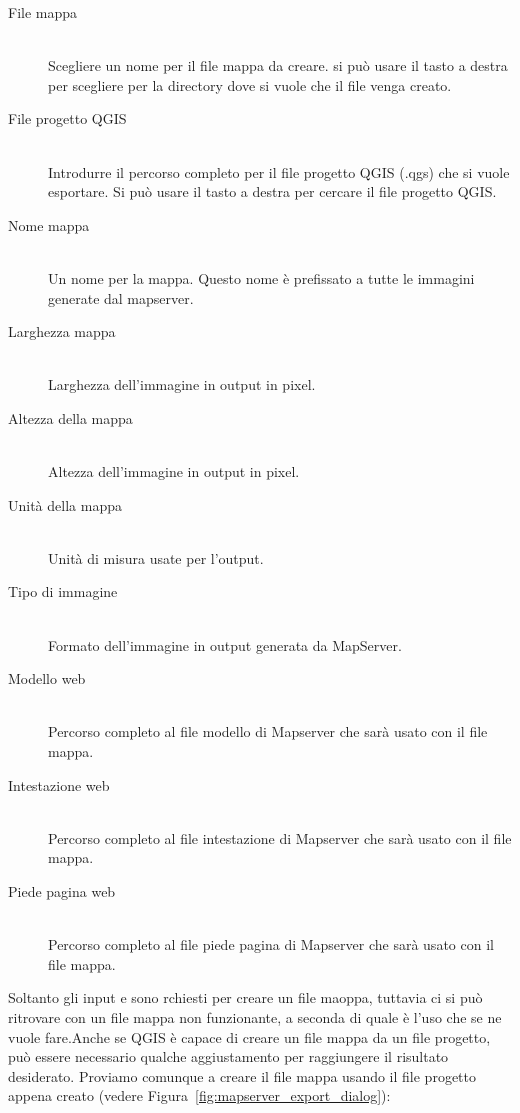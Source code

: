 \begin{description}
\item [File mappa] \mbox{}\\
Scegliere un nome per il file mappa da creare. si può usare il tasto a destra per scegliere per la directory dove si vuole che il file venga creato. 
\item [File progetto QGIS] \mbox{}\\
Introdurre il percorso completo per il file progetto QGIS (.qgs) che si vuole esportare. Si può usare il tasto a destra per cercare il file progetto QGIS.
\item [Nome mappa] \mbox{}\\
Un nome per la mappa. Questo nome è prefissato a tutte le immagini generate dal mapserver.
\item [Larghezza mappa] \mbox{}\\
Larghezza dell'immagine in output in pixel.
\item [Altezza della mappa] \mbox{}\\
Altezza dell'immagine in output in pixel.
\item [Unità della mappa] \mbox{}\\
Unità di misura usate per l'output.
\item [Tipo di immagine] \mbox{}\\
Formato dell'immagine in output generata da MapServer.
\item [Modello web] \mbox{}\\
Percorso completo al file modello di Mapserver che sarà usato con il file mappa.
\item [Intestazione web] \mbox{}\\
Percorso completo al file intestazione di Mapserver che sarà usato con il file mappa.
\item [Piede pagina web] \mbox{}\\
Percorso completo al file piede pagina di Mapserver che sarà usato con il file mappa.
\end{description}

Soltanto gli input  e  sono rchiesti per creare un file maoppa, tuttavia ci si può ritrovare con un file mappa non funzionante, a seconda di quale è l'uso che se ne vuole fare.Anche se QGIS è capace di creare un file mappa da un file progetto, può essere necessario qualche aggiustamento per raggiungere il risultato desiderato. Proviamo comunque a creare il file mappa usando il file progetto 
 appena creato 
(vedere Figura~\ref{fig:mapserver_export_dialog}):

